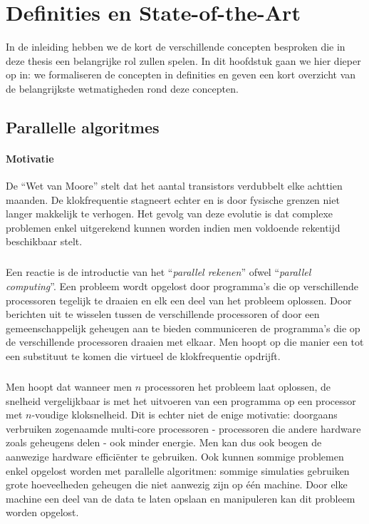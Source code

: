 \chapter{Definities en State-of-the-Art}
\label{hoofdstuk:1}

In de inleiding hebben we de kort de verschillende concepten besproken die in deze thesis een belangrijke rol zullen spelen. In dit hoofdstuk gaan we hier dieper op in: we formaliseren de concepten in definities en geven een kort overzicht van de belangrijkste wetmatigheden rond deze concepten.

\section{Parallelle algoritmes}

\subsubsection{Motivatie}

De ``Wet van Moore''\cite{4785860} stelt dat het aantal transistors verdubbelt elke achttien maanden. De klokfrequentie stagneert echter en is door fysische grenzen niet langer makkelijk te verhogen. Het gevolg van deze evolutie is dat complexe problemen enkel uitgerekend kunnen worden indien men voldoende rekentijd beschikbaar stelt.

\paragraph{}

Een reactie is de introductie van het ``\emph{parallel rekenen}'' ofwel ``\emph{parallel computing}''. Een probleem wordt opgelost door programma's die op verschillende processoren tegelijk te draaien en elk een deel van het probleem oplossen. Door berichten uit te wisselen tussen de verschillende processoren of door een gemeenschappelijk geheugen aan te bieden communiceren de programma's die op de verschillende processoren draaien met elkaar. Men hoopt op die manier een tot een substituut te komen die virtueel de klokfrequentie opdrijft.

\paragraph{}

Men hoopt dat wanneer men $n$ processoren het probleem laat oplossen, de snelheid vergelijkbaar is met het uitvoeren van een programma op een processor met $n$-voudige kloksnelheid. Dit is echter niet de enige motivatie: doorgaans verbruiken zogenaamde multi-core processoren - processoren die andere hardware zoals geheugens delen - ook minder energie. Men kan dus ook beogen de aanwezige hardware effici\"enter te gebruiken. Ook kunnen sommige problemen enkel opgelost worden met parallelle algoritmen: sommige simulaties gebruiken grote hoeveelheden geheugen die niet aanwezig zijn op \'e\'en machine. Door elke machine een deel van de data te laten opslaan en manipuleren kan dit probleem worden opgelost.

